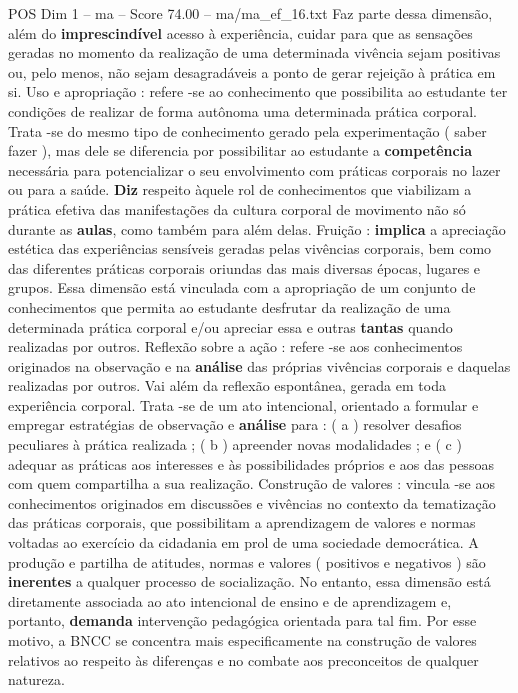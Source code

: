 \begin{textsample}{POS Dim 1 – ma – Score 74.00 – ma/ma\_ef\_16.txt}
Faz parte dessa dimensão, além do \textbf{imprescindível} acesso à experiência, cuidar para que as sensações geradas no momento da realização de uma determinada vivência sejam positivas ou, pelo menos, não sejam desagradáveis a ponto de gerar rejeição à prática em si.
Uso e apropriação : refere -se ao conhecimento que possibilita ao estudante ter condições de realizar de forma autônoma uma determinada prática corporal.
Trata -se do mesmo tipo de conhecimento gerado pela experimentação ( saber fazer ), mas dele se diferencia por possibilitar ao estudante a \textbf{competência} necessária para potencializar o seu envolvimento com práticas corporais no lazer ou para a saúde. \textbf{Diz} respeito àquele rol de conhecimentos que viabilizam a prática efetiva das manifestações da cultura corporal de movimento não só durante as \textbf{aulas}, como também para além delas.
Fruição : \textbf{implica} a apreciação estética das experiências sensíveis geradas pelas vivências corporais, bem como das diferentes práticas corporais oriundas das mais diversas épocas, lugares e grupos.
Essa dimensão está vinculada com a apropriação de um conjunto de conhecimentos que permita ao estudante desfrutar da realização de uma determinada prática corporal e/ou apreciar essa e outras \textbf{tantas} quando realizadas por outros.
Reflexão sobre a ação : refere -se aos conhecimentos originados na observação e na \textbf{análise} das próprias vivências corporais e daquelas realizadas por outros.
Vai além da reflexão espontânea, gerada em toda experiência corporal.
Trata -se de um ato intencional, orientado a formular e empregar estratégias de observação e \textbf{análise} para : ( a ) resolver desafios peculiares à prática realizada ; ( b ) apreender novas modalidades ; e ( c ) adequar as práticas aos interesses e às possibilidades próprios e aos das pessoas com quem compartilha a sua realização.
Construção de valores : vincula -se aos conhecimentos originados em discussões e vivências no contexto da tematização das práticas corporais, que possibilitam a aprendizagem de valores e normas voltadas ao exercício da cidadania em prol de uma sociedade democrática.
A produção e partilha de atitudes, normas e valores ( positivos e negativos ) são \textbf{inerentes} a qualquer processo de socialização.
No entanto, essa dimensão está diretamente associada ao ato intencional de ensino e de aprendizagem e, portanto, \textbf{demanda} intervenção pedagógica orientada para tal fim.
Por esse motivo, a BNCC se concentra mais especificamente na construção de valores relativos ao respeito às diferenças e no combate aos preconceitos de qualquer natureza.

\end{textsample}
